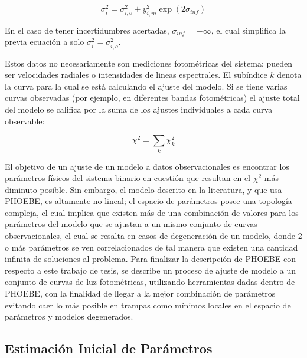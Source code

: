\begin{eqfloat}[!ht]
	\centering
	\begin{equation}
		\sigma_{i}^{2} = \sigma_{i,o}^{2} + y_{i,m}^{2} \exp{\left(2 \sigma_{inf}\right)}
	\end{equation}
\end{eqfloat}

En el caso de tener incertidumbres acertadas, $\sigma_{inf} = -\infty$, el cual
simplifica la previa ecuación a solo $\sigma_{i}^{2} = \sigma_{i,o}^{2}$.

Estos datos no necesariamente son mediciones fotométricas del sistema; pueden
ser velocidades radiales o intensidades de lineas espectrales. El subíndice $k$
denota la curva para la cual se está calculando el ajuste del modelo. Si se
tiene varias curvas observadas (por ejemplo, en diferentes bandas fotométricas)
el ajuste total del modelo se califica por la suma de los ajustes individuales a
cada curva observable:

\begin{eqfloat}[!ht]
	\centering
	\begin{equation}
		\chi^2 = \sum_{k}{\chi_{k}^{2}}
	\end{equation}
\end{eqfloat}

El objetivo de un ajuste de un modelo a datos observacionales es encontrar los
parámetros físicos del sistema binario en cuestión que resultan en el $\chi^{2}$
más diminuto posible. Sin embargo, el modelo descrito en la literatura, y que
usa PHOEBE, es altamente no-lineal; el espacio de parámetros posee una topología
compleja, el cual implica que existen más de una combinación de valores para los
parámetros del modelo que se ajustan a un mismo conjunto de curvas
observacionales, el cual se resalta en casos de degeneración de un modelo, donde
2 o más parámetros se ven correlacionados de tal manera que existen una cantidad
infinita de soluciones al problema. Para finalizar la descripción de PHOEBE con
respecto a este trabajo de tesis, se describe un proceso de ajuste de modelo a
un conjunto de curvas de luz fotométricas, utilizando herramientas dadas dentro
de PHOEBE, con la finalidad de llegar a la mejor combinación de parámetros
evitando caer lo más posible en trampas como mínimos locales en el espacio de
parámetros y modelos degenerados.

\subsection{Estimación Inicial de Parámetros}


